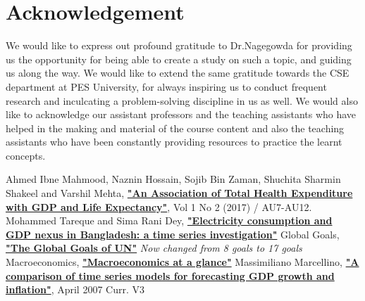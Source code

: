 \documentclass[conference]{IEEEtran}
\begin{document}
\section{Acknowledgement}
We would like to express out profound gratitude to Dr.Nagegowda for providing us the opportunity for being able to create a study on such a topic, and guiding us along the way.
We would like to extend the same gratitude towards the CSE department at PES University, for always inspiring us to conduct frequent research and inculcating a problem-solving discipline in us as well.
We would also like to acknowledge our assistant professors and the teaching assistants who have helped in the making and material of the course content and also the teaching assistants who have been constantly providing resources to practice the learnt concepts.
\begin{thebibliography}{00}
     Ahmed Ibne Mahmood, Naznin Hossain, Sojib Bin Zaman,  Shuchita Sharmin Shakeel and Varshil Mehta,  \textbf{\href{https://jmrionline.com/jmri/article/view/72/86}{"An Association of Total Health Expenditure with GDP and Life Expectancy"}}, Vol 1 No 2 (2017) / AU7-AU12.
     Mohammed Tareque and Sima Rani Dey, \textbf{\href{https://www.emerald.com/insight/content/doi/10.1108/JABES-04-2019-0029/full/pdf}{"Electricity consumption and GDP nexus in Bangladesh: a time series investigation"}}
     Global Goals, \textbf{\href{https://www.globalgoals.org/goals/}{"The Global Goals of UN"}} \emph{Now changed from 8 goals to 17 goals}
     Macroeconomics, \textbf{\href{https://www.worldbank.org/en/topic/macroeconomics/overview}{"Macroeconomics at a glance"}}
     Massimiliano Marcellino, \textbf{\href{https://www.researchgate.net/profile/Niels-Haldrup/publication/228650389_A_comparison_of_time_series_models_for_forecasting_GDP_growth_and_inflation/links/0c96051b6b0d0e7951000000/A-comparison-of-time-series-models-for-forecasting-GDP-growth-and-inflation.pdf}{"A comparison of time series models for forecasting GDP growth and inflation"}}, April 2007 Curr. V3
\end{thebibliography}
\end{document}
